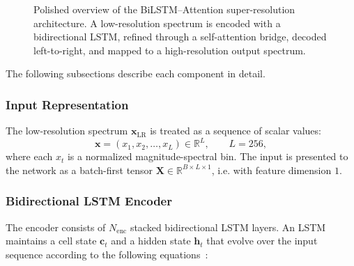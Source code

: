 \documentclass[12pt,a4paper]{report}
\begin{document}
\begin{figure}[htbp]
{%
  }

  \caption{Polished overview of the BiLSTM--Attention super-resolution architecture. A low-resolution spectrum is encoded with a bidirectional LSTM, refined through a self-attention bridge, decoded left-to-right, and mapped to a high-resolution output spectrum.}
  \label{fig:model_arch}
\end{figure}

\bigskip

The following subsections describe each component in detail.

\bigskip
\subsubsection{Input Representation}

The low-resolution spectrum $\mathbf{x}_{\mathrm{LR}}$ is treated as a sequence of scalar values:
\begin{equation}
  \mathbf{x} = (x_1, x_2, \dots, x_L) \in \mathbb{R}^{L}, \qquad L = 256,
\end{equation}
where each $x_t$ is a normalized magnitude-spectral bin.  The input is presented to the network as a batch-first tensor $\mathbf{X} \in \mathbb{R}^{B \times L \times 1}$, i.e. with feature dimension $1$.

\bigskip
\subsubsection{Bidirectional LSTM Encoder}

The encoder consists of $N_{\mathrm{enc}}$ stacked bidirectional LSTM layers.  An LSTM maintains a cell state $\mathbf{c}_t$ and a hidden state $\mathbf{h}_t$ that evolve over the input sequence according to the following equations~\cite{lstm}:
\end{document}
